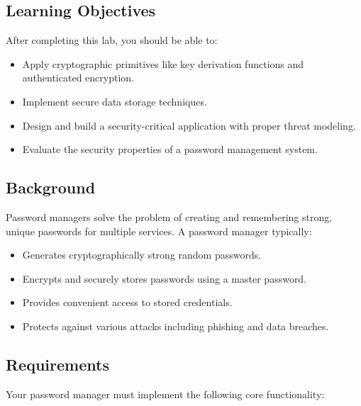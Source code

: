 \documentclass[10pt,a4paper,american]{article}
\begin{document}
\subsection*{Learning Objectives}
After completing this lab, you should be able to:
\begin{itemize}
	\item Apply cryptographic primitives like key derivation functions and authenticated encryption.
	\item Implement secure data storage techniques.
	\item Design and build a security-critical application with proper threat modeling.
	\item Evaluate the security properties of a password management system.
\end{itemize}

\subsection*{Background}
Password managers solve the problem of creating and remembering strong, unique passwords for multiple services. A password manager typically:
\begin{itemize}
	\item Generates cryptographically strong random passwords.
	\item Encrypts and securely stores passwords using a master password.
	\item Provides convenient access to stored credentials.
	\item Protects against various attacks including phishing and data breaches.
\end{itemize}

\subsection*{Requirements}
Your password manager must implement the following core functionality:
\end{document}
